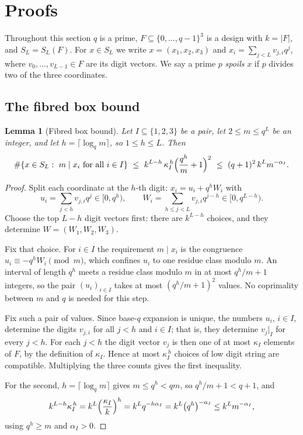\documentclass[11pt]{amsart}
\newtheorem{lemma}[theorem]{Lemma}
\theoremstyle{definition}
\theoremstyle{remark}
\begin{document}
\section{Proofs}
\label{sec:proofs}

Throughout this section $q$ is a prime, $F\subseteq\{0,\dots,q-1\}^3$ is a design with $k=|F|$, and $S_L=S_L(F)$. For $x\in S_L$ we write $x=(x_1,x_2,x_3)$ and $x_i=\sum_{j<L}v_{j,i}q^j$, where $v_0,\dots,v_{L-1}\in F$ are its digit vectors. We say a prime $p$ \emph{spoils} $x$ if $p$ divides two of the three coordinates.

\subsection*{The fibred box bound}

\begin{lemma}[Fibred box bound]
\label{lem:box}
Let $I\subseteq\{1,2,3\}$ be a pair, let $2\le m\le q^L$ be an integer, and let $h=\lceil\log_qm\rceil$, so $1\le h\le L$. Then
\[
\#\{x\in S_L:\ m\mid x_i\ \text{for all}\ i\in I\}
\ \le\ k^{L-h}\,\kappa_I^{\,h}\Bigl(\frac{q^h}{m}+1\Bigr)^{2}
\ \le\ (q+1)^2\,k^{L}m^{-\alpha_I}.
\]
\end{lemma}

\begin{proof}
Split each coordinate at the $h$-th digit: $x_i=u_i+q^hW_i$ with
\[
u_i=\sum_{j<h}v_{j,i}q^j\in[0,q^h),
\qquad
W_i=\sum_{h\le j<L}v_{j,i}q^{j-h}\in[0,q^{L-h}).
\]
Choose the top $L-h$ digit vectors first: there are $k^{L-h}$ choices, and they determine $W=(W_1,W_2,W_3)$.

Fix that choice. For $i\in I$ the requirement $m\mid x_i$ is the congruence $u_i\equiv-q^hW_i\pmod m$, which confines $u_i$ to one residue class modulo $m$. An interval of length $q^h$ meets a residue class modulo $m$ in at most $q^h/m+1$ integers, so the pair $(u_i)_{i\in I}$ takes at most $(q^h/m+1)^2$ values. No coprimality between $m$ and $q$ is needed for this step.

Fix such a pair of values. Since base-$q$ expansion is unique, the numbers $u_i$, $i\in I$, determine the digits $v_{j,i}$ for all $j<h$ and $i\in I$; that is, they determine $v_j|_I$ for every $j<h$. For each $j<h$ the digit vector $v_j$ is then one of at most $\kappa_I$ elements of $F$, by the definition of $\kappa_I$. Hence at most $\kappa_I^{\,h}$ choices of low digit string are compatible. Multiplying the three counts gives the first inequality.

For the second, $h=\lceil\log_qm\rceil$ gives $m\le q^h<qm$, so $q^h/m+1<q+1$, and
\[
k^{L-h}\kappa_I^{\,h}=k^L\Bigl(\frac{\kappa_I}{k}\Bigr)^{h}=k^Lq^{-h\alpha_I}=k^L\bigl(q^{h}\bigr)^{-\alpha_I}\le k^Lm^{-\alpha_I},
\]
using $q^h\ge m$ and $\alpha_I>0$. \qedhere
\end{proof}
\end{document}
